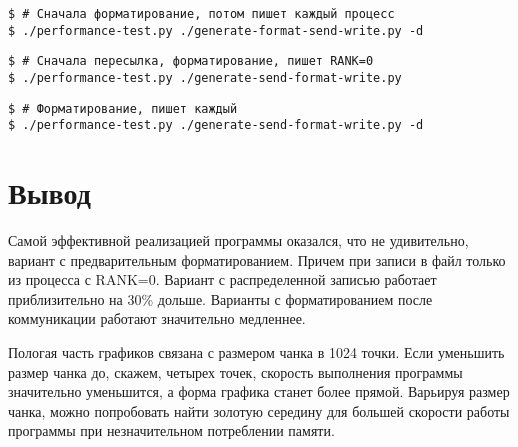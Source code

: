 \documentclass[12pt,a4paper]{article}
\begin{document}
\begin{Verbatim}
$ # Сначала форматирование, потом пишет каждый процесс
$ ./performance-test.py ./generate-format-send-write.py -d
\end{Verbatim}

\newpage

\begin{Verbatim}
$ # Сначала пересылка, форматирование, пишет RANK=0
$ ./performance-test.py ./generate-send-format-write.py
\end{Verbatim}

\newpage

\begin{Verbatim}
$ # Форматирование, пишет каждый
$ ./performance-test.py ./generate-send-format-write.py -d
\end{Verbatim}


\section{Вывод}

Самой эффективной реализацией программы оказался, что не удивительно,
вариант с предварительным форматированием. Причем при записи в файл только
из процесса с RANK=0. Вариант с распределенной записью работает приблизительно
на 30\% дольше. Варианты с форматированием после коммуникации работают
значительно медленнее.

Пологая часть графиков связана с размером чанка в 1024 точки. Если уменьшить размер
чанка до, скажем, четырех точек, скорость выполнения программы значительно уменьшится,
а форма графика станет более прямой. Варьируя размер чанка, можно попробовать
найти золотую середину для большей скорости работы программы при незначительном
потреблении памяти.
\end{document}
